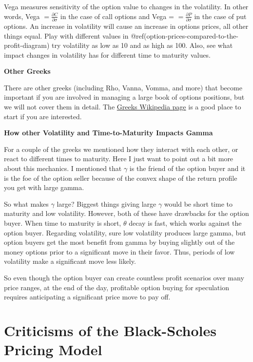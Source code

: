\documentclass[
  letterpaper,
  DIV=11,
  numbers=noendperiod]{scrreprt}
\begin{document}
Vega measures sensitivity of the option value to changes in the
volatility. In other words, Vega
\(= \frac{\partial C}{\partial \sigma}\) in the case of call options and
Vega = \(= \frac{\partial P}{\partial \sigma}\) in the case of put
options. An increase in volatility will cause an increase in options
prices, all other things equal. Play with different values in
@ref(option-prices-compared-to-the-profit-diagram) try volatility as low
as 10 and as high as 100. Also, see what impact changes in volatility
has for different time to maturity values.

\textbf{Other Greeks}

There are other greeks (including Rho, Vanna, Vomma, and more) that
become important if you are involved in managing a large book of options
positions, but we will not cover them in detail. The
\href{https://en.wikipedia.org/wiki/Greeks_(finance)}{Greeks Wikipedia
page} is a good place to start if you are interested.

\textbf{How other Volatility and Time-to-Maturity Impacts Gamma}

For a couple of the greeks we mentioned how they interact with each
other, or react to different times to maturity. Here I just want to
point out a bit more about this mechanics. I mentioned that \(\gamma\)
is the friend of the option buyer and it is the foe of the option seller
because of the convex shape of the return profile you get with large
gamma.

So what makes \(\gamma\) large? Biggest things giving large \(\gamma\)
would be short time to maturity and low volatility. However, both of
these have drawbacks for the option buyer. When time to maturity is
short, \(\theta\) decay is fast, which works against the option buyer.
Regarding volatility, sure low volatility produces large gamma, but
option buyers get the most benefit from gamma by buying slightly out of
the money options prior to a significant move in their favor. Thus,
periods of low volatility make a significant move less likely.

So even though the option buyer can create countless profit scenarios
over many price ranges, at the end of the day, profitable option buying
for speculation requires anticipating a significant price move to pay
off.

\hypertarget{criticisms-of-the-black-scholes-pricing-model}{%
\section{Criticisms of the Black-Scholes Pricing
Model}\label{criticisms-of-the-black-scholes-pricing-model}}
\end{document}
